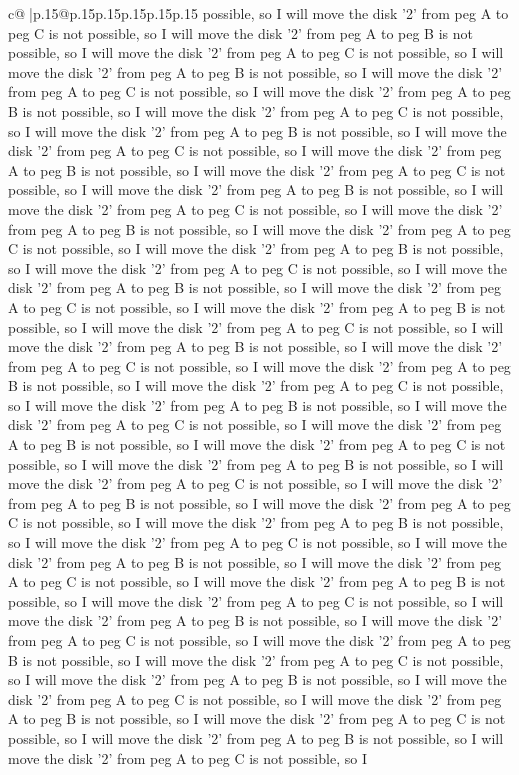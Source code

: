 \documentclass{article}
\begin{document}
{\begin{supertabular}{c@{$\;$}|p{.15\linewidth}@{}p{.15\linewidth}p{.15\linewidth}p{.15\linewidth}p{.15\linewidth}p{.15\linewidth}}
{{{possible, so I will move the disk '2' from peg A to peg C is not possible, so I will move the disk '2' from peg A to peg B is not possible, so I will move the disk '2' from peg A to peg C is not possible, so I will move the disk '2' from peg A to peg B is not possible, so I will move the disk '2' from peg A to peg C is not possible, so I will move the disk '2' from peg A to peg B is not possible, so I will move the disk '2' from peg A to peg C is not possible, so I will move the disk '2' from peg A to peg B is not possible, so I will move the disk '2' from peg A to peg C is not possible, so I will move the disk '2' from peg A to peg B is not possible, so I will move the disk '2' from peg A to peg C is not possible, so I will move the disk '2' from peg A to peg B is not possible, so I will move the disk '2' from peg A to peg C is not possible, so I will move the disk '2' from peg A to peg B is not possible, so I will move the disk '2' from peg A to peg C is not possible, so I will move the disk '2' from peg A to peg B is not possible, so I will move the disk '2' from peg A to peg C is not possible, so I will move the disk '2' from peg A to peg B is not possible, so I will move the disk '2' from peg A to peg C is not possible, so I will move the disk '2' from peg A to peg B is not possible, so I will move the disk '2' from peg A to peg C is not possible, so I will move the disk '2' from peg A to peg B is not possible, so I will move the disk '2' from peg A to peg C is not possible, so I will move the disk '2' from peg A to peg B is not possible, so I will move the disk '2' from peg A to peg C is not possible, so I will move the disk '2' from peg A to peg B is not possible, so I will move the disk '2' from peg A to peg C is not possible, so I will move the disk '2' from peg A to peg B is not possible, so I will move the disk '2' from peg A to peg C is not possible, so I will move the disk '2' from peg A to peg B is not possible, so I will move the disk '2' from peg A to peg C is not possible, so I will move the disk '2' from peg A to peg B is not possible, so I will move the disk '2' from peg A to peg C is not possible, so I will move the disk '2' from peg A to peg B is not possible, so I will move the disk '2' from peg A to peg C is not possible, so I will move the disk '2' from peg A to peg B is not possible, so I will move the disk '2' from peg A to peg C is not possible, so I will move the disk '2' from peg A to peg B is not possible, so I will move the disk '2' from peg A to peg C is not possible, so I will move the disk '2' from peg A to peg B is not possible, so I will move the disk '2' from peg A to peg C is not possible, so I will move the disk '2' from peg A to peg B is not possible, so I will move the disk '2' from peg A to peg C is not possible, so I will move the disk '2' from peg A to peg B is not possible, so I will move the disk '2' from peg A to peg C is not possible, so I will move the disk '2' from peg A to peg B is not possible, so I will move the disk '2' from peg A to peg C is not possible, so I will move the disk '2' from peg A to peg B is not possible, so I will move the disk '2' from peg A to peg C is not possible, so I }}}
\end{supertabular}}
\end{document}
